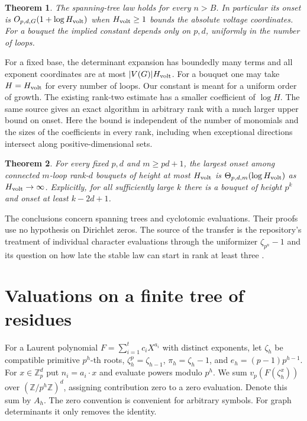 \documentclass[11pt]{article}
\newtheorem{theorem}{Theorem}[section]
\newcommand{\Z}{\mathbb Z}
\begin{document}
\begin{theorem}\label{main}
The spanning-tree law holds for every $n>B$. In particular its onset is $O_{p,d,G}(1+\log H_{\rm volt})$ when $H_{\rm volt}\ge1$ bounds the absolute voltage coordinates. For a bouquet the implied constant depends only on $p,d$, uniformly in the number of loops.
\end{theorem}

For a fixed base, the determinant expansion has boundedly many terms and all exponent coordinates are at most $|V(G)|H_{\rm volt}$. For a bouquet one may take $H=H_{\rm volt}$ for every number of loops. Our constant is meant for a uniform order of growth. The existing rank-two estimate \cite{repo} has a smaller coefficient of $\log H$. The same source gives an exact algorithm in arbitrary rank with a much larger upper bound on onset. Here the bound is independent of the number of monomials and the sizes of the coefficients in every rank, including when exceptional directions intersect along positive-dimensional sets.

\begin{theorem}\label{lower}
For every fixed $p,d$ and $m\ge pd+1$, the largest onset among connected $m$-loop rank-$d$ bouquets of height at most $H_{\rm volt}$ is $\Theta_{p,d,m}(\log H_{\rm volt})$ as $H_{\rm volt}\to\infty$. Explicitly, for all sufficiently large $k$ there is a bouquet of height $p^k$ and onset at least $k-2d+1$.
\end{theorem}

The conclusions concern spanning trees and cyclotomic evaluations. Their proofs use no hypothesis on Dirichlet zeros. The source of the transfer is the repository's treatment of individual character evaluations through the uniformizer $\zeta_{p^n}-1$ and its question on how late the stable law can start in rank at least three \cite{repo}.

\section{Valuations on a finite tree of residues}
For a Laurent polynomial $F=\sum_{i=1}^t c_i X^{a_i}$ with distinct exponents, let $\zeta_h$ be compatible primitive $p^h$-th roots, $\zeta_h^p=\zeta_{h-1}$, $\pi_h=\zeta_h-1$, and $e_h=(p-1)p^{h-1}$. For $x\in\Z_p^d$ put $n_i=a_i\cdot x$ and evaluate powers modulo $p^h$. We sum $v_p(F(\zeta_h^x))$ over $(\Z/p^h\Z)^d$, assigning contribution zero to a zero evaluation. Denote this sum by $A_h$. The zero convention is convenient for arbitrary symbols. For graph determinants it only removes the identity.
\end{document}
